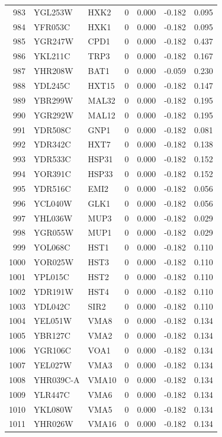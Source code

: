 \begin{longtable}{rllrrrr}
983 & YGL253W & HXK2 & 0 & 0.000 & -0.182 & 0.095\\
984 & YFR053C & HXK1 & 0 & 0.000 & -0.182 & 0.095\\
985 & YGR247W & CPD1 & 0 & 0.000 & -0.182 & 0.437\\
986 & YKL211C & TRP3 & 0 & 0.000 & -0.182 & 0.167\\
987 & YHR208W & BAT1 & 0 & 0.000 & -0.059 & 0.230\\
988 & YDL245C & HXT15 & 0 & 0.000 & -0.182 & 0.147\\
989 & YBR299W & MAL32 & 0 & 0.000 & -0.182 & 0.195\\
990 & YGR292W & MAL12 & 0 & 0.000 & -0.182 & 0.195\\
991 & YDR508C & GNP1 & 0 & 0.000 & -0.182 & 0.081\\
992 & YDR342C & HXT7 & 0 & 0.000 & -0.182 & 0.138\\
993 & YDR533C & HSP31 & 0 & 0.000 & -0.182 & 0.152\\
994 & YOR391C & HSP33 & 0 & 0.000 & -0.182 & 0.152\\
995 & YDR516C & EMI2 & 0 & 0.000 & -0.182 & 0.056\\
996 & YCL040W & GLK1 & 0 & 0.000 & -0.182 & 0.056\\
997 & YHL036W & MUP3 & 0 & 0.000 & -0.182 & 0.029\\
998 & YGR055W & MUP1 & 0 & 0.000 & -0.182 & 0.029\\
999 & YOL068C & HST1 & 0 & 0.000 & -0.182 & 0.110\\
1000 & YOR025W & HST3 & 0 & 0.000 & -0.182 & 0.110\\
1001 & YPL015C & HST2 & 0 & 0.000 & -0.182 & 0.110\\
1002 & YDR191W & HST4 & 0 & 0.000 & -0.182 & 0.110\\
1003 & YDL042C & SIR2 & 0 & 0.000 & -0.182 & 0.110\\
1004 & YEL051W & VMA8 & 0 & 0.000 & -0.182 & 0.134\\
1005 & YBR127C & VMA2 & 0 & 0.000 & -0.182 & 0.134\\
1006 & YGR106C & VOA1 & 0 & 0.000 & -0.182 & 0.134\\
1007 & YEL027W & VMA3 & 0 & 0.000 & -0.182 & 0.134\\
1008 & YHR039C-A & VMA10 & 0 & 0.000 & -0.182 & 0.134\\
1009 & YLR447C & VMA6 & 0 & 0.000 & -0.182 & 0.134\\
1010 & YKL080W & VMA5 & 0 & 0.000 & -0.182 & 0.134\\
1011 & YHR026W & VMA16 & 0 & 0.000 & -0.182 & 0.134\\

\end{longtable}
